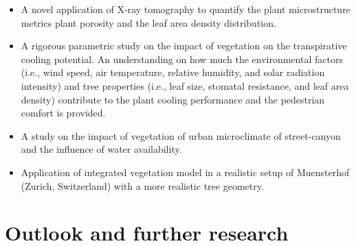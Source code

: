 \begin{itemize}
	\item A novel application of X-ray tomography to quantify the plant microstructure metrics plant porosity and the leaf area density distribution. 

	\item A rigorous parametric study on the impact of vegetation on the transpirative cooling potential. An understanding on how much the environmental factors (i.e., wind speed, air temperature, relative humidity, and solar radiation intensity) and tree properties (i.e., leaf size, stomatal resistance, and leaf area density) contribute to the plant cooling performance and the pedestrian comfort is provided. 
	
	\item A study on the impact of vegetation of urban microclimate of street-canyon and the influence of water availability.
	
	\item Application of integrated vegetation model in a realistic setup of Muensterhof (Zurich, Switzerland) with a more realistic tree geometry. 
	
\end{itemize}


\section{Outlook and further research}

